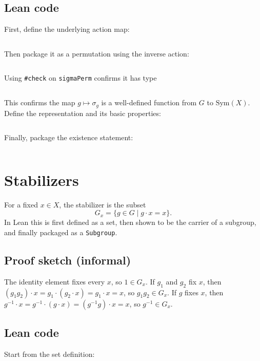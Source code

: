 \documentclass[
  12pt, %
]{assignment}
\newcommand{\leancodeurl}{}
\newcommand{\setleancodeurl}[1]{\renewcommand{\leancodeurl}{#1}}
\newcommand{\leancodefile}[3][]{%
  \setleancodeurl{#3}%
  \inputminted[fontsize=\footnotesize,breaklines,breakanywhere,tabsize=4,showspaces=false,linenos=true,#1]{lean4}{#2}%
}
\begin{document}
\subsection{Lean code}
First, define the underlying action map:
\leancodefile[firstline=26,lastline=29,firstnumber=26]{../lean/GroupAction/Permutation.lean}{https://github.com/FrankieeW/GroupAction/blob/v1.0.0/lean/GroupAction/Permutation.lean}

Then package it as a permutation using the inverse action:
\leancodefile[firstline=31,lastline=63,firstnumber=31]{../lean/GroupAction/Permutation.lean}{https://github.com/FrankieeW/GroupAction/blob/v1.0.0/lean/GroupAction/Permutation.lean}
Using \texttt{\#check} on \texttt{sigmaPerm} confirms it has type
\leancodefile[firstline=64,lastline=64,firstnumber=64]{../lean/GroupAction/Permutation.lean}{https://github.com/FrankieeW/GroupAction/blob/v1.0.0/lean/GroupAction/Permutation.lean}
This confirms the map $g \mapsto \sigma_g$ is a well-defined function from $G$ to $\mathrm{Sym}(X)$.
Define the representation and its basic properties:
\leancodefile[firstline=66,lastline=99,firstnumber=66]{../lean/GroupAction/Permutation.lean}{https://github.com/FrankieeW/GroupAction/blob/v1.0.0/lean/GroupAction/Permutation.lean}

Finally, package the existence statement:
\leancodefile[firstline=101,lastline=107,firstnumber=101]{../lean/GroupAction/Permutation.lean}{https://github.com/FrankieeW/GroupAction/blob/v1.0.0/lean/GroupAction/Permutation.lean}

\section{Stabilizers}
For a fixed $x \in X$, the stabilizer is the subset
\[
	G_x = \{ g \in G \mid g \cdot x = x \}.
\]
In Lean this is first defined as a set, then shown to be the carrier of a subgroup,
and finally packaged as a \texttt{Subgroup}.

\subsection{Proof sketch (informal)}
The identity element fixes every $x$, so $1 \in G_x$. If $g_1$ and $g_2$ fix $x$, then
$(g_1 g_2)\cdot x = g_1 \cdot (g_2 \cdot x) = g_1 \cdot x = x$, so $g_1 g_2 \in G_x$.
If $g$ fixes $x$, then
$g^{-1} \cdot x = g^{-1} \cdot (g \cdot x) = (g^{-1} g) \cdot x = x$,
so $g^{-1} \in G_x$.

\subsection{Lean code}
Start from the set definition:
\leancodefile[firstline=22,lastline=25,firstnumber=22]{../lean/GroupAction/Stabilizer.lean}{https://github.com/FrankieeW/GroupAction/blob/v1.0.0/lean/GroupAction/Stabilizer.lean}
\end{document}

